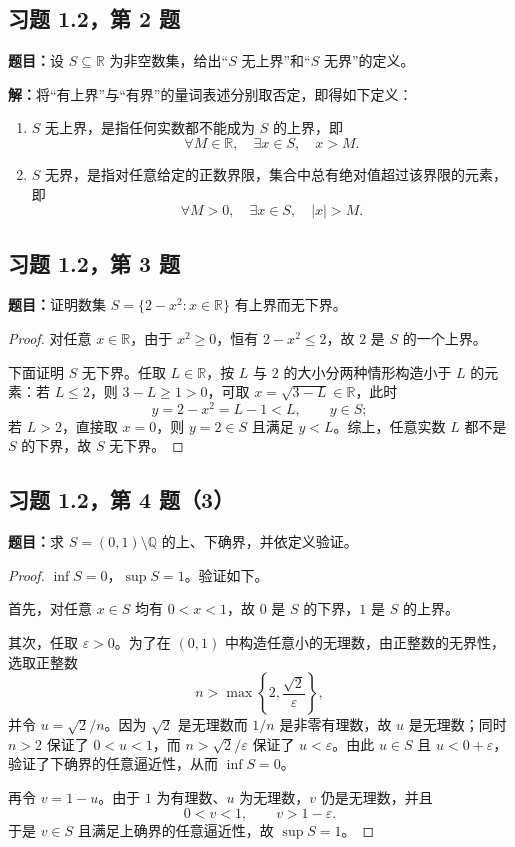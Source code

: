 \documentclass[UTF8, fontset=fandol, a4paper, 12pt]{ctexart}
\newcommand{\R}{\mathbb{R}}
\theoremstyle{definition}
\begin{document}
\subsection{习题 1.2，第 2 题}
\noindent\textbf{题目：}设 $S\subseteq\R$ 为非空数集，给出“$S$ 无上界”和“$S$ 无界”的定义。

\noindent\textbf{解：}将“有上界”与“有界”的量词表述分别取否定，即得如下定义：
\begin{enumerate}
 \item $S$ 无上界，是指任何实数都不能成为 $S$ 的上界，即
 \[
   \forall M\in\R,\quad\exists x\in S,\quad x>M.
 \]
 \item $S$ 无界，是指对任意给定的正数界限，集合中总有绝对值超过该界限的元素，即
 \[
   \forall M>0,\quad\exists x\in S,\quad |x|>M.
 \]
\end{enumerate}

\subsection{习题 1.2，第 3 题}
\noindent\textbf{题目：}证明数集 $S=\{2-x^2:x\in\R\}$ 有上界而无下界。

\begin{proof}
对任意 $x\in\R$，由于 $x^2\ge0$，恒有 $2-x^2\le2$，故 $2$ 是 $S$ 的一个上界。

下面证明 $S$ 无下界。任取 $L\in\R$，按 $L$ 与 $2$ 的大小分两种情形构造小于 $L$ 的元素：若 $L\le2$，则 $3-L\ge1>0$，可取 $x=\sqrt{3-L}\in\R$，此时
\[
 y=2-x^2=L-1<L,\qquad y\in S;
\]
若 $L>2$，直接取 $x=0$，则 $y=2\in S$ 且满足 $y<L$。综上，任意实数 $L$ 都不是 $S$ 的下界，故 $S$ 无下界。
\end{proof}

\subsection{习题 1.2，第 4 题（3）}
\noindent\textbf{题目：}求 $S=(0,1)\setminus\mathbb{Q}$ 的上、下确界，并依定义验证。

\begin{proof}
$\inf S=0$，$\sup S=1$。验证如下。

首先，对任意 $x\in S$ 均有 $0<x<1$，故 $0$ 是 $S$ 的下界，$1$ 是 $S$ 的上界。

其次，任取 $\varepsilon>0$。为了在 $(0,1)$ 中构造任意小的无理数，由正整数的无界性，选取正整数
\[
 n>\max\left\{2,\frac{\sqrt2}{\varepsilon}\right\},
\]
并令 $u=\sqrt2/n$。因为 $\sqrt2$ 是无理数而 $1/n$ 是非零有理数，故 $u$ 是无理数；同时 $n>2$ 保证了 $0<u<1$，而 $n>\sqrt2/\varepsilon$ 保证了 $u<\varepsilon$。由此 $u\in S$ 且 $u<0+\varepsilon$，验证了下确界的任意逼近性，从而 $\inf S=0$。

再令 $v=1-u$。由于 $1$ 为有理数、$u$ 为无理数，$v$ 仍是无理数，并且
\[
 0<v<1,\qquad v>1-\varepsilon.
\]
于是 $v\in S$ 且满足上确界的任意逼近性，故 $\sup S=1$。
\end{proof}
\end{document}
